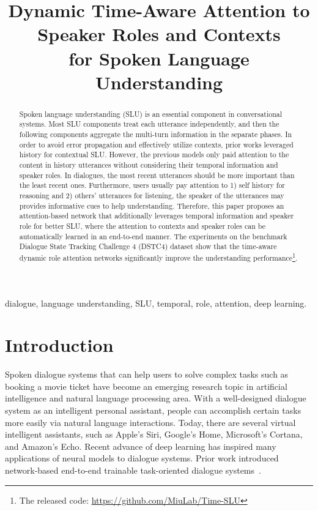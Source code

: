 \documentclass{article}
\title{Dynamic Time-Aware Attention to Speaker Roles and Contexts \\for Spoken Language Understanding}
\begin{document}
%
\maketitle
%
\begin{abstract}
Spoken language understanding (SLU) is an essential component in conversational systems.
Most SLU components treat each utterance independently, and then the following components aggregate the multi-turn information in the separate phases.
In order to avoid error propagation and effectively utilize contexts, prior works leveraged history for contextual SLU.
However, the previous models only paid attention to the content in history utterances without considering their temporal information and speaker roles.
In dialogues, the most recent utterances should be more important than the least recent ones.
Furthermore, users usually pay attention to 1) self history for reasoning and 2) others’ utterances for listening, the speaker of the utterances may provides informative cues to help understanding.
Therefore, this paper proposes an attention-based network that additionally leverages temporal information and speaker role for better SLU, where the attention to contexts and speaker roles can be automatically learned in an end-to-end manner.
The experiments on the benchmark Dialogue State Tracking Challenge 4 (DSTC4) dataset show that the time-aware dynamic role attention networks significantly improve the understanding performance\footnote{The released code: \url{https://github.com/MiuLab/Time-SLU}}.
\end{abstract}
%
\begin{keywords}
dialogue, language understanding, SLU, temporal, role, attention, deep learning.
\end{keywords}
%

\section{Introduction}
\label{sec:intro}
Spoken dialogue systems that can help users to solve complex tasks such as booking a movie ticket have become an emerging research topic in artificial intelligence and natural language processing area. 
With a well-designed dialogue system as an intelligent personal assistant, people can accomplish certain tasks more easily via natural language interactions. 
Today, there are several virtual intelligent assistants, such as Apple's Siri, Google's Home, Microsoft's Cortana, and Amazon's Echo. Recent advance of deep learning has inspired many applications of neural models to dialogue systems. Prior work introduced network-based end-to-end trainable task-oriented dialogue systems~\cite{wen2017network,bordes2017learning,dhingra2017towards,li2017end}.
\end{document}
